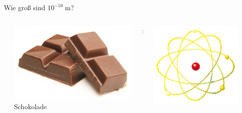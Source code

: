 \documentclass{beamer}
\newcommand{\m}{\ensuremath{\;\text{m}}\xspace}
\begin{document}
\begin{frame}
\begin{columns}[T]
\begin{column}{0.25\textwidth}
    \end{column}
    \begin{column}{0.75\textwidth}
      \centering
      \alert{Wie gro\ss{} sind $10^{-10}\m$?}
      \begin{columns}
        \begin{column}{0.1\textwidth}
        \end{column}
        \begin{column}{0.35\textwidth}
          \centering 
          \includegraphics[height=0.18\textheight]{matter/schokolade.jpg}\\
          Schokolade
        \end{column}
        \begin{column}{0.1\textwidth}
          \centering
          {\Huge :}
        \end{column}
        \begin{column}{0.35\textwidth}
          \centering
          \includegraphics[height=0.18\textheight]{matter/Atom.png}\\

\end{column}
\end{columns}
\end{column}
\end{columns}
\end{frame}
\end{document}
